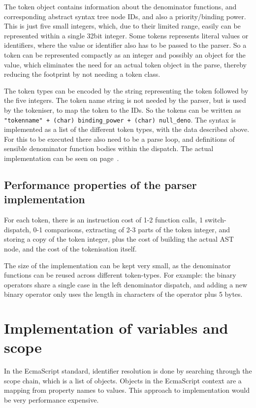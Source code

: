 \documentclass[11pt]{report}
\begin{document}
The token object contains information about the denominator functions, and corresponding abstract syntax tree node IDs, and also a priority/binding power.
This is just five small integers, which, due to their limited range, easily can be represented within a single 32bit integer. 
Some tokens represents literal values or identifiers, where the value or identifier also has to be passed to the parser.
So a token can be represented compactly as an integer and possibly an object for the value, which eliminates the need for an actual token object in the parse, thereby reducing the footprint by not needing a token class.

The token types can be encoded by the string representing the token followed by the five integers.
The token name string is not needed by the parser, but is used by the tokeniser, to map the token to the IDs.
So the tokens can be written as {\tt "tokenname" + (char) binding\_power + 
(char) null\_deno}. 
The syntax is implemented as a list of the different token types, with the data described above.
For this to be executed there also need to be a parse loop, and definitions of sensible denominator function bodies within the dispatch.
The actual implementation can be seen on page~\pageref{code-lightscript-parser}.


\subsection{Performance properties of the parser implementation}

For each token, there is an instruction cost of 1-2 function calls, 1 switch-dispatch, 0-1 comparisons, extracting of 2-3 parts of the token integer, and storing a copy of the token integer, plus the cost of building the actual AST node, and the cost of the tokenisation itself.

The size of the implementation can be kept very small, as the denominator functions can be reused across different token-types. For example: the binary operators share a single case in the left denominator dispatch, and adding a new binary operator only uses the length in characters of the operator plus 5 bytes. 

\section{Implementation of variables and scope}
In the EcmaScript standard, identifier resolution is done by searching through the scope chain, which is a list of objects. Objects in the EcmaScript context are a mapping from property names to values. This approach to implementation would be very performance expensive.
\end{document}

